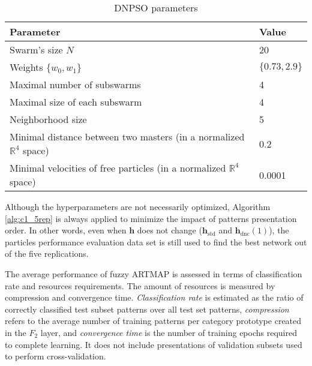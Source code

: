 \begin{table*}[t]
	\footnotesize
  \centering
  \caption{DNPSO parameters}
  \begin{tabular*}{\linewidth}{@{\extracolsep{\fill}}|ll|}
  	\hline
	  \textbf{Parameter} & \textbf{Value}     										\\ \hline
		Swarm's size $N$												&  20    						\\ 
		Weights $\{w_0,w_1\}$ 									&  $\{0.73,2.9\}	$	\\ 
		Maximal number of subswarms   					&  4    						\\ 
		Maximal size of each subswarm 					&  4    						\\ 
		Neighborhood size												&  5    						\\ 
		Minimal distance between two masters 
			(in a normalized $\mathbb{R}^4$ space) & 0.2   						\\ 
		Minimal velocities of free particles 
			(in a normalized $\mathbb{R}^4$ space) & 0.0001    				\\\hline	
	\end{tabular*}
	\label{tab:c1_pso}
\end{table*}

Although the hyperparameters are not necessarily optimized, Algorithm \ref{alg:c1_5rep} is always applied to minimize the impact of patterns presentation order. In other words, even when $\textbf{h}$ does not change ($\textbf{h}_\text{std}$ and $\textbf{h}_\text{dnc}(1)$), the particles performance evaluation data set  is still used to find the best network out of the five replications.

The average performance of fuzzy ARTMAP is assessed in terms of classification rate and resources requirements. The amount of resources is measured by compression and convergence time. \emph{Classification rate} is estimated as the ratio of correctly classified test subset patterns over all test set patterns, \emph{compression} refers to the average number of training patterns per category prototype created in the $F_2$ layer, and \emph{convergence time} is the number of training epochs required to complete learning. It does not include presentations of validation subsets used to perform cross-validation.

